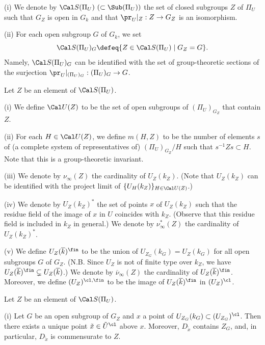 (i) We denote by ${\Cal S}(\Pi_U)\  (\subset \Sub(\Pi_U))$ 
the set of closed subgroups $Z$ of $\Pi_U$ 
such that $G_Z$ is open in $G_{k}$ and that 
$\pr_U|_Z:Z\to G_Z$ is an isomorphism. 

\noindent
(ii) For each open subgroup $G$ of $G_{k}$, 
we set 
$${\Cal S}(\Pi_U)_G\defeq\{Z\in {\Cal S}(\Pi_U)\mid G_Z=G\}.$$
Namely, 
${\Cal S}(\Pi_U)_G$ can be identified with the set of group-theoretic 
sections of the surjection $\pr_U|_{(\Pi_U)_G}: (\Pi_U)_G\to G$. 
\enddefinition

Let $Z$ be an element of ${\Cal S}(\Pi_U)$. 

\noindent
(i) We define ${\Cal U}(Z)$ to be the set of open subgroups of 
$(\Pi_U)_{G_Z}$ that contain $Z$. 

\noindent
(ii) For each $H\in {\Cal U}(Z)$, we define $m(H,Z)$ to be the number 
of elements $s$ of (a complete system of representatives of) 
$(\Pi_U)_{G_Z}/H$ such that $s^{-1}Zs\subset H$. 
Note that this is a group-theoretic invariant. 

\noindent
(iii) We denote 
by $\nu_\infty(Z)$ the cardinality of $U_Z(k_Z)$. 
(Note that $U_Z(k_Z)$ 
can be identified with the project limit 
of $\{U_H(k_Z)\}_{H\in{\Cal U}(Z)}$.)

\noindent
(iv) We denote by $U_Z(k_{Z})^\ast$ 
the set of points $x$ of $U_Z(k_Z)$ such that the residue field of 
the image of $x$ in $U$ coincides with $k_Z$. (Observe that this 
residue field is included in $k_Z$ in general.) 
We denote by $\nu_\infty^\ast(Z)$ the cardinality of $U_Z(k_Z)^\ast$. 

\noindent
(v) We define 
$U_Z(\overline{k})^{\fin}$ to be the union 
of $U_{Z_{G}}(k_{G})=U_Z(k_{G})$ for all 
open subgroups $G$ of $G_Z$. (N.B. Since $U_Z$ is 
not of finite type over $k_Z$, we have 
$U_Z(\overline{k})^{\fin}\subsetneq U_Z(\overline{k})$.)
We denote by ${\overline\nu}_\infty(Z)$ the cardinality of 
$U_Z(\overline{k})^{\fin}$. Moreover, 
we define $(U_Z)^{\cl,\fin}$ to be the image of 
$U_Z(\overline{k})^{\fin}$ in $(U_Z)^{\cl}$. 
\enddefinition 

Let $Z$ be an element of ${\Cal S}(\Pi_U)$. 

\noindent
{\rm (i)} Let $G$ be an open subgroup of $G_Z$ and 
$x$ a point of $U_{Z_{G}}(k_G)\subset (U_{Z_{G}})^{\cl}$. Then 
there exists a unique point ${\tilde x}\in{\tilde U}^{\cl}$ above $x$. 
Moreover, $D_{\tilde x}$ contains $Z_{G}$, and, 
in particular, $D_{\tilde x}$ is commensurate to $Z$. 

